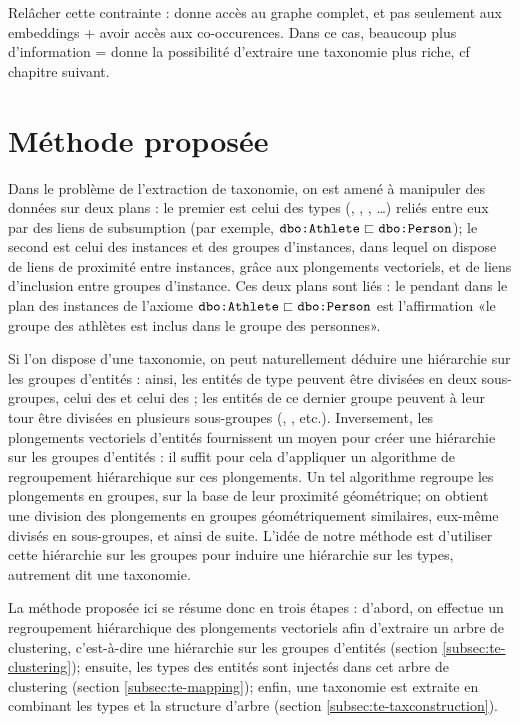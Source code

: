 Relâcher cette contrainte : donne accès au graphe complet, et pas seulement aux embeddings + avoir accès aux co-occurences. Dans ce cas, beaucoup plus d'information = donne la possibilité d'extraire une taxonomie plus riche, cf chapitre suivant.


\section{Méthode proposée}
\label{sec:te-method}

Dans le problème de l'extraction de taxonomie, on est amené à manipuler des données sur deux plans : le premier est celui des types (, , , \ldots) reliés entre eux par des liens de subsumption (par exemple, $\texttt{dbo:Athlete} \sqsubset \texttt{dbo:Person}$); le second est celui des instances et des groupes d'instances, dans lequel on dispose de liens de proximité entre instances, grâce aux plongements vectoriels, et de liens d'inclusion entre groupes d'instance. Ces deux plans sont liés : le pendant dans le plan des instances de l'axiome $\texttt{dbo:Athlete} \sqsubset \texttt{dbo:Person}$ est l'affirmation «le groupe des athlètes est inclus dans le groupe des personnes».

Si l'on dispose d'une taxonomie, on peut naturellement déduire une hiérarchie sur les groupes d'entités : ainsi, les entités de type  peuvent être divisées en deux sous-groupes, celui des  et celui des ; les entités de ce dernier groupe peuvent à leur tour être divisées en plusieurs sous-groupes (, , etc.). Inversement, les plongements vectoriels d'entités fournissent un moyen pour créer une hiérarchie sur les groupes d'entités : il suffit pour cela d'appliquer un algorithme de regroupement hiérarchique sur ces plongements. Un tel algorithme regroupe les plongements en groupes, sur la base de leur proximité géométrique; on obtient une division des plongements en groupes géométriquement similaires, eux-même divisés en sous-groupes, et ainsi de suite. L'idée de notre méthode est d'utiliser cette hiérarchie sur les groupes pour induire une hiérarchie sur les types, autrement dit une taxonomie.

La méthode proposée ici se résume donc en trois étapes : d'abord, on effectue un regroupement hiérarchique des plongements vectoriels afin d'extraire un arbre de clustering, c'est-à-dire une hiérarchie sur les groupes d'entités (section \ref{subsec:te-clustering}); ensuite, les types des entités sont injectés dans cet arbre de clustering (section \ref{subsec:te-mapping}); enfin, une taxonomie est extraite en combinant les types et la structure d'arbre (section \ref{subsec:te-taxconstruction}).

